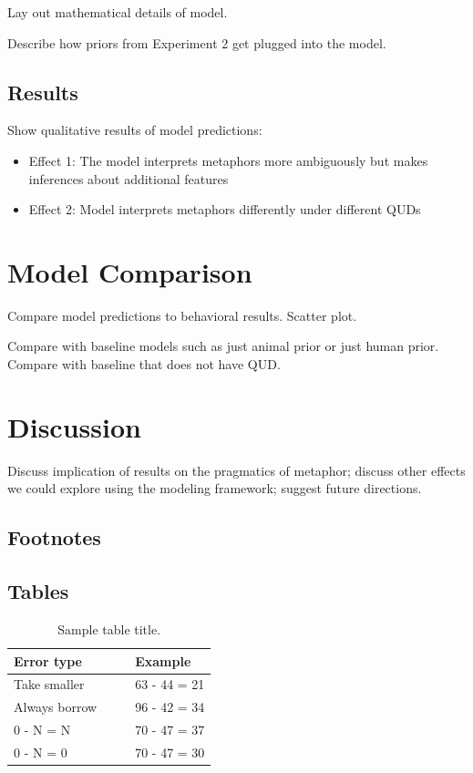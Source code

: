 \documentclass[10pt,letterpaper]{article}
\begin{document}
Lay out mathematical details of model.

Describe how priors from Experiment 2 get plugged into the model.
\subsection{Results}
Show qualitative results of model predictions: 
\begin{itemize}
\item[] Effect 1: The model interprets metaphors more ambiguously but makes inferences about additional features
\item[] Effect 2: Model interprets metaphors differently under different QUDs
\end{itemize}

\section{Model Comparison}
Compare model predictions to behavioral results. Scatter plot.

Compare with baseline models such as just animal prior or just human prior. Compare with baseline that does not have QUD.

\section{Discussion}
Discuss implication of results on the pragmatics of metaphor; discuss other effects we could explore using the modeling framework; suggest future directions.

\subsection{Footnotes}


\subsection{Tables}

\begin{table}[!ht]
\begin{center} 
\caption{Sample table title.} 
\label{sample-table} 
\vskip 0.12in
\begin{tabular}{ll} 
\hline
Error type    &  Example \\
\hline
Take smaller        &   63 - 44 = 21 \\
Always borrow~~~~   &   96 - 42 = 34 \\
0 - N = N           &   70 - 47 = 37 \\
0 - N = 0           &   70 - 47 = 30 \\
\hline
\end{tabular} 
\end{center} 
\end{table}
\end{document}
